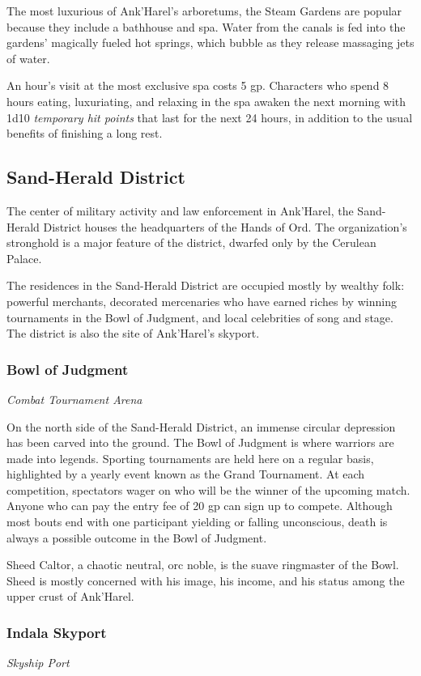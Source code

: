 \documentclass[10pt,a4paper,twoside,fancy,bg=print,twocolumn,openany,nodeprecatedcode]{dndbook}
\begin{document}
The most luxurious of Ank'Harel's arboretums, the Steam Gardens are popular because they include a bathhouse and spa. Water from the canals is fed into the gardens' magically fueled hot springs, which bubble as they release massaging jets of water.

An hour's visit at the most exclusive spa costs 5 gp. Characters who spend 8 hours eating, luxuriating, and relaxing in the spa awaken the next morning with 1d10 \textit{temporary hit points} that last for the next 24 hours, in addition to the usual benefits of finishing a long rest.

\subsection{Sand-Herald District}
The center of military activity and law enforcement in Ank'Harel, the Sand-Herald District houses the headquarters of the Hands of Ord. The organization's stronghold is a major feature of the district, dwarfed only by the Cerulean Palace.

The residences in the Sand-Herald District are occupied mostly by wealthy folk: powerful merchants, decorated mercenaries who have earned riches by winning tournaments in the Bowl of Judgment, and local celebrities of song and stage. The district is also the site of Ank'Harel's skyport.

\subsubsection{Bowl of Judgment}
\textit{Combat Tournament Arena}

On the north side of the Sand-Herald District, an immense circular depression has been carved into the ground. The Bowl of Judgment is where warriors are made into legends. Sporting tournaments are held here on a regular basis, highlighted by a yearly event known as the Grand Tournament. At each competition, spectators wager on who will be the winner of the upcoming match. Anyone who can pay the entry fee of 20 gp can sign up to compete. Although most bouts end with one participant yielding or falling unconscious, death is always a possible outcome in the Bowl of Judgment.

Sheed Caltor, a chaotic neutral, orc noble, is the suave ringmaster of the Bowl. Sheed is mostly concerned with his image, his income, and his status among the upper crust of Ank'Harel.

\subsubsection{Indala Skyport}
\textit{Skyship Port}
\end{document}
